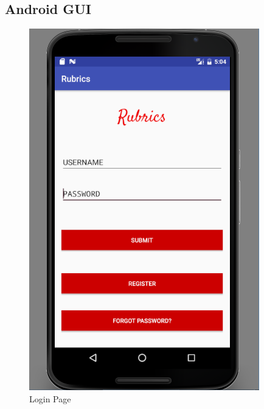 \subsection{Android GUI}
\begin{figure}[!h]
\begin{minipage}[t]{0.5\linewidth}
    \centering
\hfill\includegraphics[scale=.65]{project/images/loginnew}\hspace*{\fill}
    \caption{Login Page}
    \label{f1}
\end{minipage}
\hspace{0.1cm}
\begin{minipage}[t]{0.5\linewidth} 
    \centering

\end{minipage}
\end{figure}
